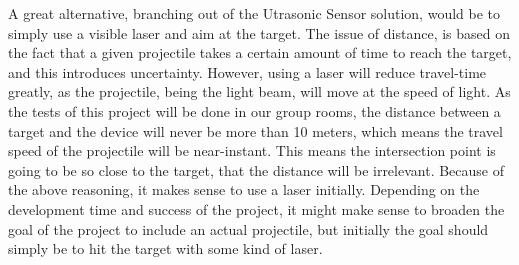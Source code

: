 A great alternative, branching out of the Utrasonic Sensor solution, would be to simply use a visible laser and aim at the target.
The issue of distance, is based on the fact that a given projectile takes a certain amount of time to reach the target, and this introduces uncertainty. 
However, using a laser will reduce travel-time greatly, as the projectile, being the light beam, will move at the speed of light.
As the tests of this project will be done in our group rooms, the distance between a target and the device will never be more than 10 meters, which means the travel speed of the projectile will be near-instant. 
This means the intersection point is going to be so close to the target, that the distance will be irrelevant.
Because of the above reasoning, it makes sense to use a laser initially.
Depending on the development time and success of the project, it might make sense to broaden the goal of the project to include an actual projectile, but initially the goal should simply be to hit the target with some kind of laser.
